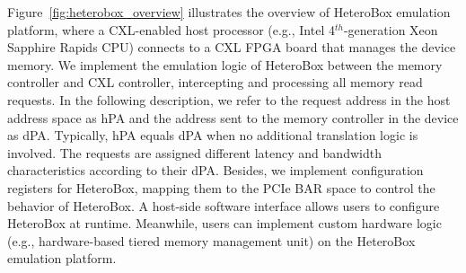 % 

Figure~\ref{fig:heterobox_overview} illustrates the overview of HeteroBox emulation platform, where a CXL-enabled host processor (e.g., Intel 4$^{th}$-generation Xeon Sapphire Rapids CPU) connects to a CXL FPGA board that manages the device memory. 
We implement the emulation logic of HeteroBox between the memory controller and CXL controller, intercepting and processing all memory read requests. 
In the following description, we refer to the request address in the host address space as hPA and the address sent to the memory controller in the device as dPA. Typically, hPA equals dPA when no additional translation logic is involved.
The requests are assigned different latency and bandwidth characteristics according to their dPA.
Besides, we implement configuration registers for HeteroBox, mapping them to the PCIe BAR space to control the behavior of HeteroBox. A host-side software interface allows users to configure HeteroBox at runtime.
Meanwhile, users can implement custom hardware logic (e.g., hardware-based tiered memory management unit) on the HeteroBox emulation platform. 

